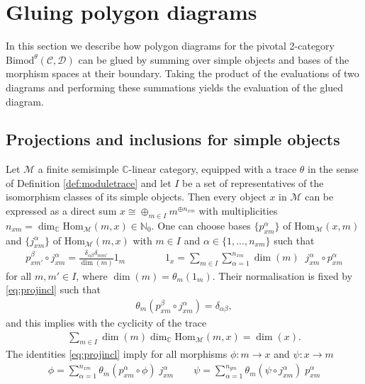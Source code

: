 \documentclass[1.5pt, a4paper]{article}
\newcommand{\C}{\mathbb{C}}
\newcommand{\mac}{\mathcal C}
\newcommand{\mad}{\mathcal D}
\newcommand{\mam}{\mathcal M}
\newcommand{\Hom}{\mathrm{Hom}}
\newcommand{\Bimod}{\mathrm{Bimod}}
\begin{document}
\section{Gluing polygon diagrams}
\label{sec:projincl}

In this section we describe how polygon diagrams for the pivotal 2-category $\Bimod^\theta(\mac,\mad)$  can be glued by summing over simple objects and bases of the morphism spaces at their boundary. Taking the product of the evaluations of  two diagrams and performing these summations  yields the evaluation of the glued diagram.



\subsection{Projections and inclusions for simple objects}
Let $\mam$ a finite semisimple  $\C$-linear category, equipped with a trace $\theta$ in the sense of Definition \ref{def:moduletrace} and let $I$ be a set of representatives of the isomorphism classes of its simple objects. 
Then  every object $x$ in $\mam$ can be expressed as a direct sum $x\cong \oplus_{m\in I} m^{\oplus n_{xm}}$ with multiplicities $n_{xm}=\dim_\C \Hom_\mam(m,x)\in\mathbb N_0$. 
One can choose bases
 $\{p^\alpha_{xm}\}$ of $\Hom_\mathcal M(x,m)$ and  $\{j^\alpha_{xm}\}$ of $\Hom_\mam(m,x)$ with $m\in I$ and $\alpha\in\{1,..., n_{xm}\}$
such that 
\begin{align}\label{eq:projincl}
p^\beta_{xm'} \circ j^\alpha_{xm}=\frac{\delta_{\alpha\beta} \delta_{mm'}}{\dim(m)}1_m \qquad\qquad 1_x=\sum_{m\in I}\sum_{\alpha=1}^{n_{xm}} \dim(m) \;\; j^\alpha_{xm}\circ p^\alpha_{xm}
\end{align}
for all $m,m'\in I$, where $\dim(m)=\theta_m(1_m)$. 
Their normalisation is fixed by \eqref{eq:projincl}  such that  
\begin{align}
\theta_m(p^\beta_{xm}\circ j^\alpha_{xm})=\delta_{\alpha\beta},
\end{align}
and this implies with the cyclicity of the trace 
\begin{align}\label{eq:dimformula}
\sum_{m\in I} \dim(m) \dim_{\C}\Hom_\mam(m,x)=\dim (x).
\end{align}
The identities \eqref{eq:projincl}  imply for all morphisms $\phi: m\to x$ and $\psi:x\to m$
\begin{align}\label{eq:traceidnd}
\phi=\sum_{\alpha=1}^{n_{xm}} \theta_m(p^\alpha_{xm}\circ \phi)\; j^\alpha_{xm}\qquad  \psi=\sum_{\alpha=1}^{n_{ym}} \theta_m(\psi\circ j^\alpha_{xm})\; p^\alpha_{xm}
\end{align}
\end{document}

